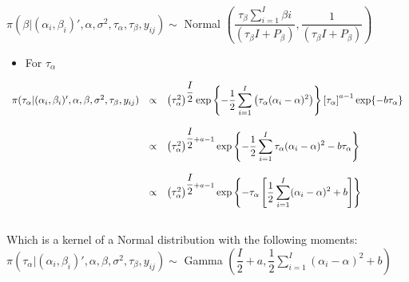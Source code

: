 \documentclass{article}
\begin{document}
$\pi(\beta |(\alpha_i, \beta_i)', \alpha, \sigma^2, \tau_\alpha, \tau_\beta ,y_{ij}) \sim $ Normal $\left( \dfrac{\tau_{\beta}\displaystyle\sum_{i=1}^{I}\beta{i}}{(\tau_{\beta}I + P_{\beta})}, \dfrac{1}{(\tau_{\beta}I + P_{\beta})} \right)$

\begin{itemize}
\item For $\tau_\alpha$
\end{itemize}
\begin{equation*}
\begin{array}{lcl ll }

\pi(\tau_\alpha|(\alpha_i, \beta_i)', \alpha, \beta, \sigma^2, \tau_\beta ,y_{ij}) & \propto & \left(\tau_{\alpha}^2\right)^{\dfrac{I}{2}} \mbox{exp}\left\{ - \dfrac{1}{2} 
\displaystyle\sum_{i=1}^{I} \left( \tau_{\alpha}(\alpha_{i} - \alpha)^2 \right)\right\} \left[\tau_\alpha \right]^{a -1} \mbox{exp} \{ - b\tau_\alpha\} \\ \\

& \propto & \left(\tau_{\alpha}^2\right)^{\dfrac{I}{2} + a -1} \mbox{exp}\left\{ - \dfrac{1}{2}\displaystyle\sum_{i=1}^{I} \tau_{\alpha}(\alpha_{i} - \alpha)^2 - b\tau_{\alpha} \right\} \\ \\

& \propto & \left(\tau_{\alpha}^2\right)^{\dfrac{I}{2} + a -1} \mbox{exp}\left\{ - \tau_{\alpha}\left[ \dfrac{1}{2}\displaystyle\sum_{i=1}^{I}(\alpha_{i} - \alpha)^2 + b \right]\right\} \\ \\


 \end{array}
\end{equation*}

Which is a kernel of a Normal distribution with the following moments:\\

$\pi(\tau_\alpha |(\alpha_i, \beta_i)', \alpha, \beta, \sigma^2, \tau_\beta ,y_{ij}) \sim $ Gamma $\left( \dfrac{I}{2} + a , \dfrac{1}{2}\displaystyle\sum_{i=1}^{I}(\alpha_{i} - \alpha)^2 + b \right)$
\end{document}
